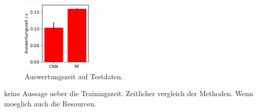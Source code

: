 \begin{figure}
		\centering
		\includegraphics[width=0.3\textwidth]{pictures/time.pdf}
		\caption{Auswertungszeit auf Testdaten.}
		\label{fig:}
\end{figure}
keine Aussage ueber die Trainingszeit.
Zeitlicher vergleich der Methoden.
Wenn moeglich auch die Resourcen.

